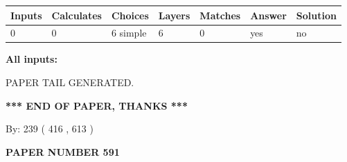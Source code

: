 \documentclass[12pt]{article}
\begin{document}
 
\noindent{}
 
 
   
   
   
   
\noindent\begin{tabular}{|l|l|l|l|l|l|l|}
 \hline
Inputs & Calculates & Choices & Layers & Matches & Answer & Solution \\ \hline
 0  & 
 0  & 
 6
  simple  
  & 
 6  & 
 0  & 
  yes & 
  no 
  \\ \hline
 \end{tabular}
   
   
   
   
\noindent{}
   
   
   
   
\noindent\vspace{0.1in}\hspace{-0.08in} {\textbf{\Large{All inputs: }}}
   
   
   
   
   
   
 \vspace{0.2in}
 
   
   
\vspace{2.0in} PAPER TAIL GENERATED.
   
   
   
   
\vspace{1.0in} 
{\textbf{\large{ *** END OF PAPER, THANKS *** }}} 
   
   
\hspace{1.0in} By: 
 239 ( 416 ,  613 )
   
   
   
   
\newpage 
\setcounter{page}{ 
   591001 } 
   
   
   
   
 {\textbf{ \Large{ PAPER NUMBER  591  }}}
   
   
\vspace{0.2in}
   
   
   
   
   
   
   
   
 \vspace{0.2in}
 
\end{document}
